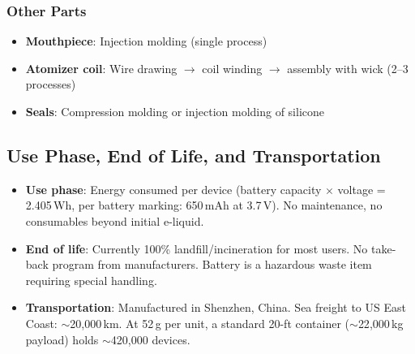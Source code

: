 \subsubsection{Other Parts}
\begin{itemize}
    \item \textbf{Mouthpiece}: Injection molding (single process)
    \item \textbf{Atomizer coil}: Wire drawing $\rightarrow$ coil winding $\rightarrow$ assembly with wick (2--3 processes)
    \item \textbf{Seals}: Compression molding or injection molding of silicone
\end{itemize}

\subsection{Use Phase, End of Life, and Transportation}

\begin{itemize}
    \item \textbf{Use phase}: Energy consumed per device (battery capacity $\times$ voltage = 2.405\,Wh, per battery marking: 650\,mAh at 3.7\,V). No maintenance, no consumables beyond initial e-liquid.
    \item \textbf{End of life}: Currently 100\% landfill/incineration for most users. No take-back program from manufacturers. Battery is a hazardous waste item requiring special handling.
    \item \textbf{Transportation}: Manufactured in Shenzhen, China. Sea freight to US East Coast: $\sim$20{,}000\,km. At 52\,g per unit, a standard 20-ft container ($\sim$22{,}000\,kg payload) holds $\sim$420{,}000 devices.
\end{itemize}
